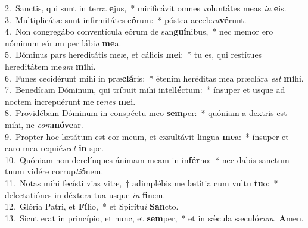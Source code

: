 {2.~}Sanctis, qui sunt in terra \textbf{e}jus,~* mirificávit omnes voluntátes meas \textit{in} \textbf{e}is.\\
{3.~}Multiplicátæ sunt infirmitátes e\textbf{ó}rum:~* póstea accele\textit{ra}\textbf{vé}runt.\\
{4.~}Non congregábo conventícula eórum de san\textbf{guí}nibus,~* nec memor ero nóminum eórum per lábi\textit{a} \textbf{me}a.\\
{5.~}Dóminus pars hereditátis meæ, et cálicis \textbf{me}i:~* tu es, qui restítues hereditátem me\textit{am} \textbf{mi}hi.\\
{6.~}Funes cecidérunt mihi in præ\textbf{clá}ris:~* étenim heréditas mea præclára \textit{est} \textbf{mi}hi.\\
{7.~}Benedícam Dóminum, qui tríbuit mihi intel\textbf{lé}ctum:~* ínsuper et usque ad noctem increpuérunt me re\textit{nes} \textbf{me}i.\\
{8.~}Providébam Dóminum in conspéctu meo \textbf{sem}per:~* quóniam a dextris est mihi, ne \textit{com}\textbf{mó}\textbf{ve}ar.\\
{9.~}Propter hoc lætátum est cor meum, et exsultávit lingua \textbf{me}a:~* ínsuper et caro mea requié\textit{scet} \textbf{in} spe.\\
{10.~}Quóniam non derelínques ánimam meam in in\textbf{fér}no:~* nec dabis sanctum tuum vidére corrup\textit{ti}\textbf{ó}nem.\\
{11.~}Notas mihi fecísti vias vitæ,~† adimplébis me lætítia cum vultu \textbf{tu}o:~* delectatiónes in déxtera tua usque \textit{in} \textbf{fi}nem.\\
{12.~}Glória Patri, et \textbf{Fí}lio,~* et Spirítu\textit{i} \textbf{San}cto.\\
{13.~}Sicut erat in princípio, et nunc, et \textbf{sem}per,~* et in sǽcula sæculó\textit{rum}. \textbf{A}men.\\
